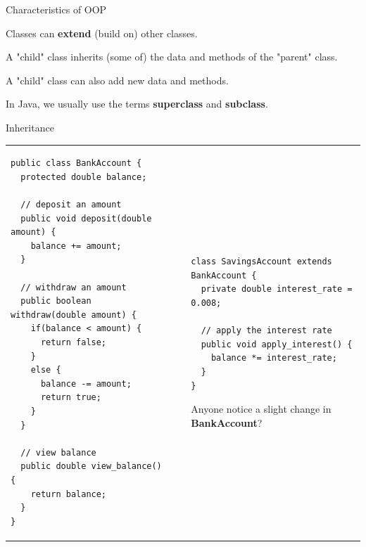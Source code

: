 \documentclass{beamer}
\makeatletter
\newenvironment{deflist}
{ \begin{description}
    \setlength{\itemsep}{6pt}
    \setlength{\parskip}{0pt}
    \setlength{\parsep}{0pt}     }
{ \end{description}                  }
\newenvironment{splitslide}
{
\centering
\begin{tabular}{@{}p{0.50\textwidth} | p{0.025\textwidth}@{} p{0.4\textwidth}@{}}
}
{
\end{tabular}
}
\makeatother
\begin{document}
\begin{frame}{Characteristics of OOP}
	\begin{deflist}
		\item[Inheritance]
		Classes can \textbf{extend} (build on) other classes.
		\item[] A "child" class inherits (some of) the data and methods of the "parent" class.	
		\item[] A "child" class can also add new data and methods.
		\item[] In Java, we usually use the terms \textbf{superclass} and \textbf{subclass}.
	\end{deflist}
\end{frame}



\begin{frame}[fragile]{Inheritance}
\begin{splitslide}

\begin{Verbatim}[fontsize=\tiny]
public class BankAccount {
  protected double balance;
  
  // deposit an amount
  public void deposit(double amount) {
    balance += amount;
  }
  
  // withdraw an amount
  public boolean withdraw(double amount) {
    if(balance < amount) {
      return false;
    }
    else {
      balance -= amount;
      return true;
    }
  }
  
  // view balance
  public double view_balance() {
    return balance;  
  }
}
\end{Verbatim}

&&

\begin{Verbatim}[fontsize=\tiny]
class SavingsAccount extends BankAccount {
  private double interest_rate = 0.008;
  
  // apply the interest rate
  public void apply_interest() {
    balance *= interest_rate;
  }
}
\end{Verbatim}


\vspace{1.5em}
\raggedright
Anyone notice a slight change in \textbf{BankAccount}?

\end{splitslide}
\end{frame}
\end{document}

